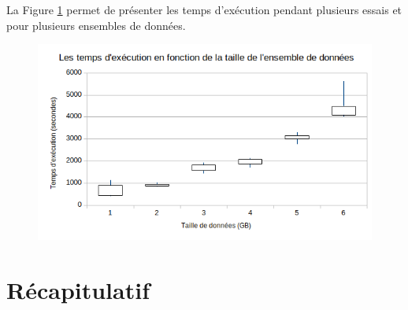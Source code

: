 \begin{table}[H]
	\centering
	\captionsetup{justification=centering}
	\caption{Les temps d'exécution lors de la détection des anomalies en utilisant Spark (approche $2$)}
	\label{tab:spark-timing-reajustedcode}
\end{table}


La Figure 	\ref{fig:moustachespark} permet de présenter les temps d'exécution pendant plusieurs essais et pour plusieurs ensembles de données.
\begin{figure}[H]
	\centering
	\includegraphics[width=0.7\linewidth]{illustrations/moustacheSpark}
	\caption{}
	\label{fig:moustachespark}
\end{figure}


\section{Récapitulatif}

